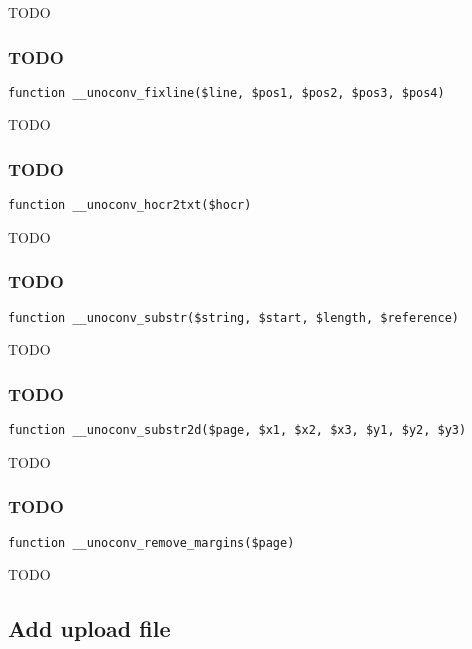 \documentclass[a4paper]{article}
\begin{document}
TODO

\hypertarget{toc545}{}
\subsubsection{TODO}

\begin{lstlisting}
function __unoconv_fixline($line, $pos1, $pos2, $pos3, $pos4)
\end{lstlisting}

TODO

\hypertarget{toc546}{}
\subsubsection{TODO}

\begin{lstlisting}
function __unoconv_hocr2txt($hocr)
\end{lstlisting}

TODO

\hypertarget{toc547}{}
\subsubsection{TODO}

\begin{lstlisting}
function __unoconv_substr($string, $start, $length, $reference)
\end{lstlisting}

TODO

\hypertarget{toc548}{}
\subsubsection{TODO}

\begin{lstlisting}
function __unoconv_substr2d($page, $x1, $x2, $x3, $y1, $y2, $y3)
\end{lstlisting}

TODO

\hypertarget{toc549}{}
\subsubsection{TODO}

\begin{lstlisting}
function __unoconv_remove_margins($page)
\end{lstlisting}

TODO

\hypertarget{toc550}{}
\subsection{Add upload file}
\end{document}
